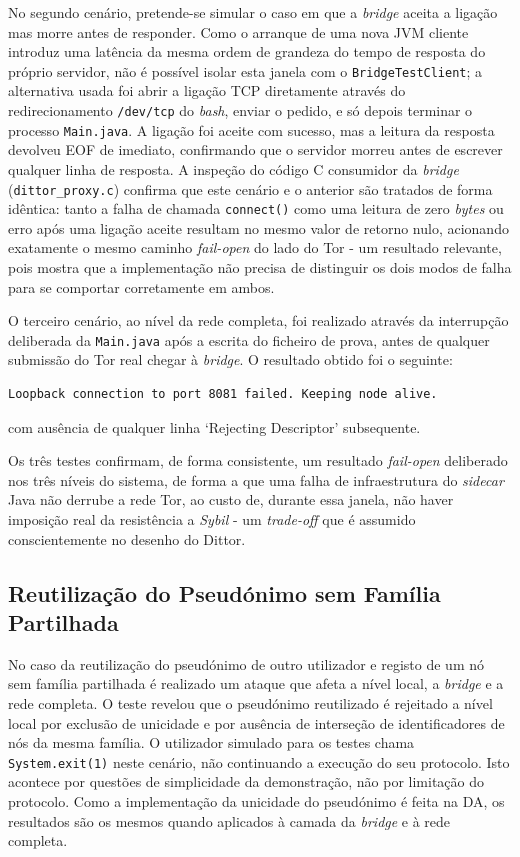 No segundo cenário, pretende-se simular o caso em que a \textit{bridge} aceita a ligação mas morre antes de responder. Como o arranque de uma nova JVM cliente introduz uma latência da mesma ordem de grandeza do tempo de resposta do próprio servidor, não é possível isolar esta janela com o \texttt{BridgeTestClient}; a alternativa usada foi abrir a ligação TCP diretamente através do redirecionamento \texttt{/dev/tcp} do \textit{bash}, enviar o pedido, e só depois terminar o processo \texttt{Main.java}. A ligação foi aceite com sucesso, mas a leitura da resposta devolveu EOF de imediato, confirmando que o servidor morreu antes de escrever qualquer linha de resposta. A inspeção do código C consumidor da \textit{bridge} (\texttt{dittor\_proxy.c}) confirma que este cenário e o anterior são tratados de forma idêntica: tanto a falha de chamada \texttt{connect()} como uma leitura de zero \textit{bytes} ou erro após uma ligação aceite resultam no mesmo valor de retorno nulo, acionando exatamente o mesmo caminho \textit{fail-open} do lado do Tor - um resultado relevante, pois mostra que a implementação não precisa de distinguir os dois modos de falha para se comportar corretamente em ambos.

O terceiro cenário, ao nível da rede completa, foi realizado através da interrupção deliberada da \texttt{Main.java} após a escrita do ficheiro de prova, antes de qualquer submissão do Tor real chegar à \textit{bridge}. O resultado obtido foi o seguinte:

\begin{lstlisting}
Loopback connection to port 8081 failed. Keeping node alive.
\end{lstlisting}

com ausência de qualquer linha `Rejecting Descriptor' subsequente.

Os três testes confirmam, de forma consistente, um resultado \textit{fail-open} deliberado nos três níveis do sistema, de forma a que uma falha de infraestrutura do \textit{sidecar} Java não derrube a rede Tor, ao custo de, durante essa janela, não haver imposição real da resistência a \textit{Sybil} - um \textit{trade-off} que é assumido conscientemente no desenho do Dittor.

\subsection{Reutilização do Pseudónimo sem Família Partilhada}
\label{sub:teste_reutilizacao_pseudonimo}

No caso da reutilização do pseudónimo de outro utilizador e registo de um nó sem família partilhada é realizado um ataque que afeta a nível local, a \textit{bridge} e a rede completa. O teste revelou que o pseudónimo reutilizado é rejeitado a nível local por exclusão de unicidade e por ausência de interseção de identificadores de nós da mesma família. O utilizador simulado para os testes chama \texttt{System.exit(1)} neste cenário, não continuando a execução do seu protocolo. Isto acontece por questões de simplicidade da demonstração, não por limitação do protocolo. Como a implementação da unicidade do pseudónimo é feita na DA, os resultados são os mesmos quando aplicados à camada da \textit{bridge} e à rede completa.

